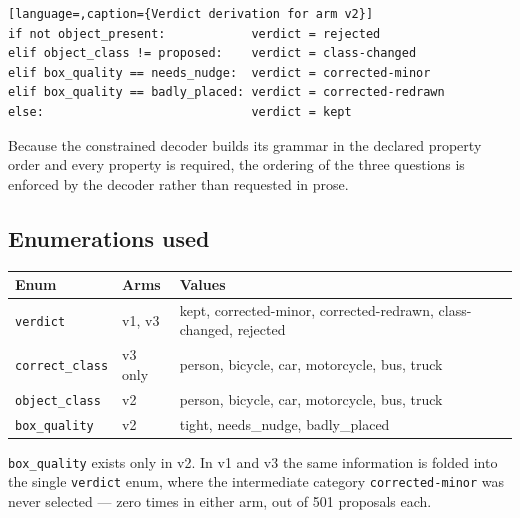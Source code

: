 \begin{lstlisting}[language=,caption={Verdict derivation for arm v2}]
if not object_present:            verdict = rejected
elif object_class != proposed:    verdict = class-changed
elif box_quality == needs_nudge:  verdict = corrected-minor
elif box_quality == badly_placed: verdict = corrected-redrawn
else:                             verdict = kept
\end{lstlisting}

\noindent
Because the constrained decoder builds its grammar in the declared property
order and every property is required, the ordering of the three questions is
enforced by the decoder rather than requested in prose.

\subsection{Enumerations used}

\begin{center}
\small
\begin{tabular}{lll}
\toprule
Enum & Arms & Values \\
\midrule
\texttt{verdict} & v1, v3 & kept, corrected-minor, corrected-redrawn, class-changed, rejected \\
\texttt{correct\_class} & v3 only & person, bicycle, car, motorcycle, bus, truck \\
\texttt{object\_class} & v2 & person, bicycle, car, motorcycle, bus, truck \\
\texttt{box\_quality} & v2 & tight, needs\_nudge, badly\_placed \\
\bottomrule
\end{tabular}
\end{center}

\noindent
\texttt{box\_quality} exists only in v2. In v1 and v3 the same information is
folded into the single \texttt{verdict} enum, where the intermediate category
\texttt{corrected-minor} was never selected --- zero times in either arm, out of
501 proposals each.
